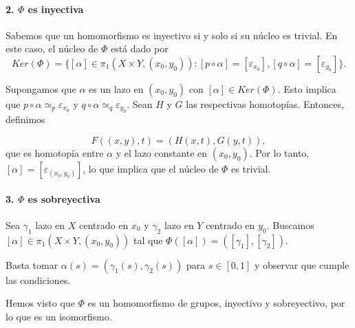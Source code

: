 {    \paragraph{2. $\Phi$ es inyectiva}
    Sabemos que un homomorfismo es inyectivo si y solo si su núcleo es trivial. En este caso, el núcleo de $\Phi$ está dado por
    \[
        Ker(\Phi) = \{[\alpha] \in \pi_1(X \times Y, (x_0, y_0)) : [p \circ \alpha] = [\varepsilon_{x_0}], [q \circ \alpha] = [\varepsilon_{y_0}]\}.  
    \]

    Supongamos que $\alpha$ es un lazo en $(x_0, y_0)$ con $[\alpha] \in Ker(\Phi)$. Esto implica que $p \circ \alpha \simeq_p \varepsilon_{x_0}$ y $q \circ \alpha \simeq_q \varepsilon_{y_0}$. Sean $H$ y $G$ las respectivas homotopías. Entonces, definimos

    \[
        F((x, y), t) = (H(x, t), G(y, t)),
    \]
    que es homotopía entre $\alpha$ y el lazo constante en $(x_0, y_0)$. Por lo tanto, $[\alpha] = [\varepsilon_{(x_0, y_0)}]$, lo que implica que el núcleo de $\Phi$ es trivial.
    \paragraph{3. $\Phi$ es sobreyectiva}
    Sea $\gamma_1$ lazo en $X$ centrado en $x_0$ y $\gamma_2$ lazo en $Y$ centrado en $y_0$. Buscamos $[\alpha] \in \pi_1(X \times Y, (x_0, y_0))$ tal que $\Phi([\alpha]) = ([\gamma_1], [\gamma_2])$. 

    Basta tomar $\alpha(s) = (\gamma_1(s), \gamma_2(s))$ para $s \in [0, 1]$ y observar que cumple las condiciones. 

    \vspace{0.5cm}
    Hemos visto que $\Phi$ es un homomorfismo de grupos, inyectivo y sobreyectivo, por lo que es un isomorfismo. 
}   


